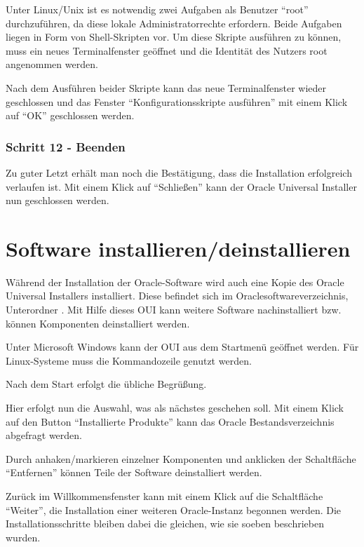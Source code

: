           Unter Linux/Unix ist es notwendig zwei Aufgaben als Benutzer \enquote{root} durchzuführen, da diese lokale Administratorrechte erfordern. Beide Aufgaben liegen in Form von Shell-Skripten vor. Um diese Skripte ausführen zu können, muss ein neues Terminalfenster geöffnet und die Identität des Nutzers root angenommen werden.

          Nach dem Ausführen beider Skripte kann das neue Terminalfenster wieder geschlossen und das Fenster \enquote{Konfigurationsskripte ausführen} mit einem Klick auf \enquote{OK} geschlossen werden.


\clearpage
        \subsubsection{Schritt 12 - Beenden}
          Zu guter Letzt erhält man noch die Bestätigung, dass die Installation erfolgreich verlaufen ist. Mit einem Klick auf \enquote{Schließen} kann der Oracle Universal Installer nun geschlossen werden.
    \section{Software installieren/deinstallieren}
      Während der Installation der Oracle-Software wird auch eine Kopie des Oracle Universal Installers installiert. Diese befindet sich im Oraclesoftwareverzeichnis, Unterordner . Mit Hilfe dieses OUI kann weitere Software nachinstalliert bzw. können Komponenten deinstalliert werden.

      Unter Microsoft Windows kann der OUI aus dem Startmenü geöffnet werden. Für Linux-Systeme muss die Kommandozeile genutzt werden.


      Nach dem Start erfolgt die übliche Begrüßung.

      Hier erfolgt nun die Auswahl, was als nächstes geschehen soll. Mit einem Klick auf den Button \enquote{Installierte Produkte} kann das Oracle Bestandsverzeichnis abgefragt werden.

      Durch anhaken/markieren einzelner Komponenten und anklicken der Schaltfläche \enquote{Entfernen} können Teile der Software deinstalliert werden.

      Zurück im Willkommensfenster kann mit einem Klick auf die Schaltfläche \enquote{Weiter}, die Installation einer weiteren Oracle-Instanz begonnen werden. Die Installationsschritte bleiben dabei die gleichen, wie sie soeben beschrieben wurden.
\clearpage
